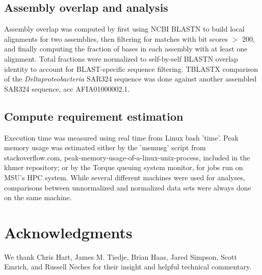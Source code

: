 \documentclass[10pt]{article}
\begin{document}
\subsection*{Assembly overlap and analysis}

Assembly overlap was computed by first using NCBI BLASTN to build local
alignments for two assemblies, then filtering for matches with bit scores
$>$ 200, and finally computing the fraction of bases in each assembly
with at least one alignment.  Total fractions were normalized to
self-by-self BLASTN overlap identity to account for BLAST-specific
sequence filtering.
TBLASTX comparison of the {\em Deltaproteobacteria} SAR324 sequence
was done against another assembled SAR324 sequence, acc AFIA01000002.1.

\subsection*{Compute requirement estimation}

Execution time was measured using real time from Linux bash 'time'.
Peak memory usage was estimated either by the 'memusg' script from
stackoverflow.com, peak-memory-usage-of-a-linux-unix-process, included
in the khmer repository; or by the Torque queuing system monitor, for
jobs run on MSU's HPC system.  While several different machines were
used for analyses, comparisons between unnormalized and normalized
data sets were always done on the same machine.

\section*{Acknowledgments}

We thank Chris Hart, James M. Tiedje, Brian Haas, Jared Simpson, Scott
Emrich, and Russell Neches for their insight and helpful technical
commentary.


\end{document}
